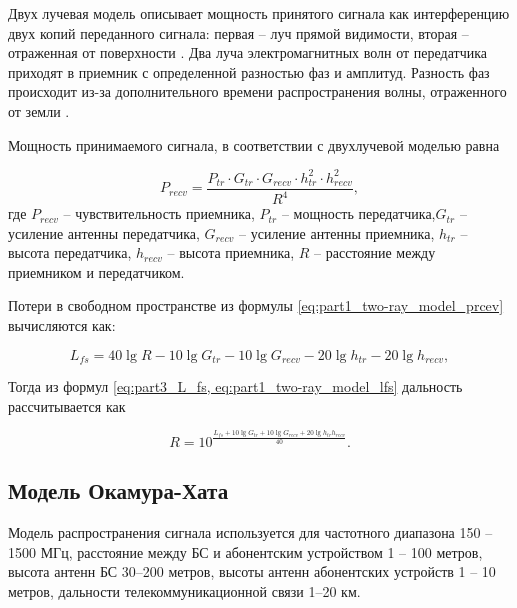 Двух лучевая модель описывает мощность принятого сигнала как интерференцию двух копий переданного сигнала: первая -- луч прямой видимости, вторая -- отраженная от поверхности \cite{Gaitan2020}. 
Два луча электромагнитных волн от передатчика приходят в приемник с определенной разностью фаз и амплитуд. Разность фаз происходит из-за дополнительного времени распространения волны, отраженного от земли \cite{Rademacher2016, Bacco2014, Zochmann2017, Kurt2017}. 


Мощность принимаемого сигнала, в соответствии с двухлучевой моделью равна

\begin{equation}
  \label{eq:part1_two-ray_model_prcev}
  P_{recv} = \frac{P_{tr} \cdot G_{tr} \cdot G_{recv} \cdot h^2_{tr} \cdot h^2_{recv}}{R^4},
\end{equation}
где $P_{recv}$ -- чувствительность приемника, $P_{tr}$ -- мощность передатчика,$G_{tr}$ -- усиление антенны передатчика, $G_{recv}$ -- усиление антенны приемника, $h_{tr}$ -- высота передатчика, $h_{recv}$ -- высота приемника, $R$ -- расстояние между приемником и передатчиком.

Потери в свободном пространстве из формулы \cref{eq:part1_two-ray_model_prcev} вычисляются как:

\begin{equation}
  \label{eq:part1_two-ray_model_lfs}
  L_{fs} = 40\lg{R} - 10\lg{G_{tr}} - 10\lg{G_{recv}} - 20\lg{h_{tr}} - 20\lg{h_{recv}},
\end{equation}

Тогда из формул \cref{eq:part3_L_fs, eq:part1_two-ray_model_lfs} дальность рассчитывается как

\begin{equation}
  \label{eq:part1_two-ray_model_r}
  R = 10^\frac{L_{fs} + 10\lg{G_{tr}} + 10\lg{G_{recv}} + 20\lg{h_{tr}h_{recv}}}{40}.
\end{equation}



\subsection{Модель Окамура-Хата}

Модель распространения \cite{Hata1980} сигнала используется для частотного диапазона 150 -- 1500 МГц, расстояние между БС и абонентским устройством 1 -- 100 метров, высота антенн БС 30--200 метров, высоты антенн абонентских устройств 1 -- 10 метров, дальности телекоммуникационной связи 1--20 км.

